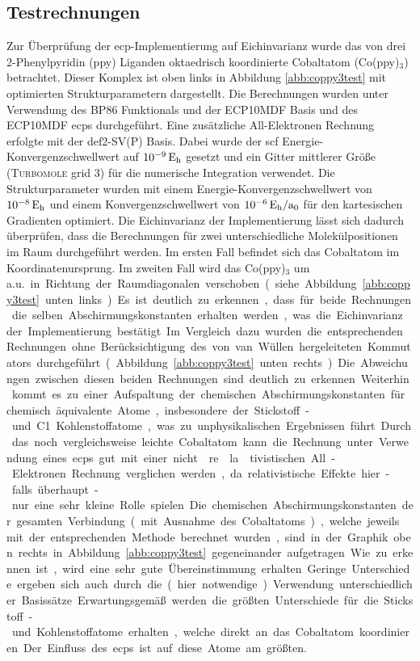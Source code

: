 	\subsection{Testrechnungen}
	Zur Überprüfung der \ac{ecp}-Implementierung auf Eichinvarianz wurde das von drei 2-Phenylpyridin (ppy) Liganden oktaedrisch koordinierte Cobaltatom (Co(ppy)$_3$) betrachtet. Dieser Komplex ist oben links in Abbildung \ref{abb:coppy3test} mit optimierten Strukturparametern dargestellt. Die Berechnungen wurden unter Verwendung des BP86 Funktionals\supercite{perdew1986density,becke1988density} und der ECP10MDF Basis und des ECP10MDF \acp{ecp}\supercite{dolg1987energy} durchgeführt. Eine zusätzliche All-Elektronen Rechnung erfolgte mit der def2-SV(P) Basis\supercite{weigend2005balanced}. Dabei wurde der \ac{scf} Energie-Konvergenzschwellwert auf $\unit[10^{-9}]{E_{\textrm{h}}}$ gesetzt und ein Gitter mittlerer Größe (\textsc{Turbomole} grid 3) für die numerische Integration\supercite{treutler1995efficient,treutlerphdthesis} verwendet. Die Strukturparameter wurden mit einem Energie-Konvergenzschwellwert von $\unit[10^{-8}]{E_{\textrm{h}}}$ und einem Konvergenzschwellwert von $\unit[10^{-6}]{E_{\textrm{h}}/a_0}$ für den kartesischen Gradienten optimiert. Die Eichinvarianz der Implementierung lässt sich dadurch überprüfen, dass die Berechnungen für zwei unterschiedliche Molekülpositionen im Raum durchgeführt werden. Im ersten Fall befindet sich das Cobaltatom im Koordinatenursprung. Im zweiten Fall wird das Co(ppy)$_3$ um \unit[10]{a.u.} in Richtung der Raumdiagonalen verschoben (siehe Abbildung \ref{abb:coppy3test} unten links). Es ist deutlich zu erkennen, dass für beide Rechnungen die selben Abschirmungskonstanten erhalten werden, was die Eichinvarianz der Implementierung bestätigt. Im Vergleich dazu wurden die entsprechenden Rechnungen ohne Berücksichtigung des von van Wüllen hergeleiteten Kommutators durchgeführt (Abbildung \ref{abb:coppy3test} unten rechts). Die Abweichungen zwischen diesen beiden Rechnungen sind deutlich zu erkennen. Weiterhin kommt es zu einer Aufspaltung der chemischen Abschirmungskonstanten für chemisch äquivalente Atome, insbesondere der Stickstoff- und C1 Kohlenstoffatome, was zu unphysikalischen Ergebnissen führt. Durch das noch vergleichsweise leichte Cobaltatom kann die Rechnung unter Verwendung eines \acp{ecp} gut mit einer nicht\-re\-la\-tivistischen All-Elektronen Rechnung verglichen werden, da relativistische Effekte hier - falls überhaupt - nur eine sehr kleine Rolle spielen. Die chemischen Abschirmungskonstanten der gesamten Verbindung (mit Ausnahme des Cobaltatoms), welche jeweils mit der entsprechenden Methode berechnet wurden, sind in der Graphik oben rechts in Abbildung \ref{abb:coppy3test} gegeneinander aufgetragen. Wie zu erkennen ist, wird eine sehr gute Übereinstimmung erhalten. Geringe Unterschiede ergeben sich auch durch die (hier notwendige) Verwendung unterschiedlicher Basissätze. Erwartungsgemäß werden die größten Unterschiede für die Stickstoff- und Kohlenstoffatome erhalten, welche direkt an das Cobaltatom koordinieren. Der Einfluss des \acp{ecp} ist auf diese Atome am größten.  


